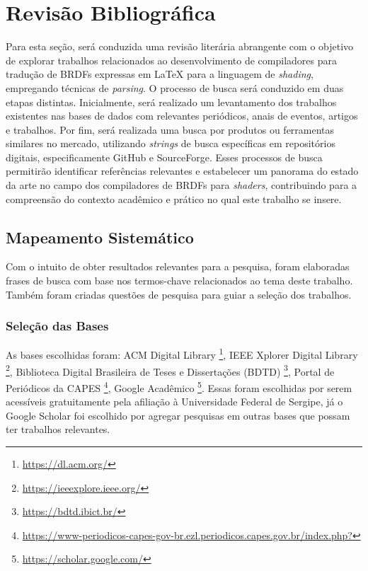 
\chapter{Revisão Bibliográfica} \label{revisao}


Para esta seção, será conduzida uma revisão literária abrangente com o objetivo de explorar trabalhos relacionados ao desenvolvimento de compiladores para tradução de BRDFs expressas em \LaTeX{} para a linguagem de \textit{shading}, empregando técnicas de \textit{parsing}. O processo de busca será conduzido em duas etapas distintas. Inicialmente, será realizado um levantamento dos trabalhos existentes nas bases de dados  com relevantes periódicos, anais de eventos, artigos e trabalhos. Por fim, será realizada uma busca por produtos ou ferramentas similares no mercado, utilizando \textit{strings} de busca específicas em repositórios digitais, especificamente GitHub e SourceForge. Esses processos de busca permitirão identificar referências relevantes e estabelecer um panorama do estado da arte no campo dos compiladores de BRDFs  para \textit{shaders}, contribuindo para a compreensão do contexto acadêmico e prático no qual este trabalho se insere.


\section{Mapeamento Sistemático}


Com o intuito de obter resultados relevantes para a pesquisa, foram elaboradas frases de busca com base nos termos-chave relacionados ao tema deste trabalho. Também foram criadas questões de pesquisa para guiar a seleção dos trabalhos.


\subsection{Seleção das Bases}
As bases escolhidas foram: ACM Digital Library \footnote{\url{https://dl.acm.org/}},  IEEE Xplorer Digital Library \footnote{\url{https://ieeexplore.ieee.org/}},  Biblioteca Digital Brasileira de Teses e Dissertações (BDTD) \footnote{\url{https://bdtd.ibict.br/}}, Portal de Periódicos da CAPES \footnote{\url{https://www-periodicos-capes-gov-br.ezl.periodicos.capes.gov.br/index.php?}},  Google Acadêmico \footnote{\url{https://scholar.google.com/}}. Essas foram escolhidas por serem acessíveis gratuitamente pela afiliação à Universidade Federal de Sergipe, já o Google Scholar foi escolhido por agregar pesquisas em outras bases que possam ter trabalhos relevantes.


